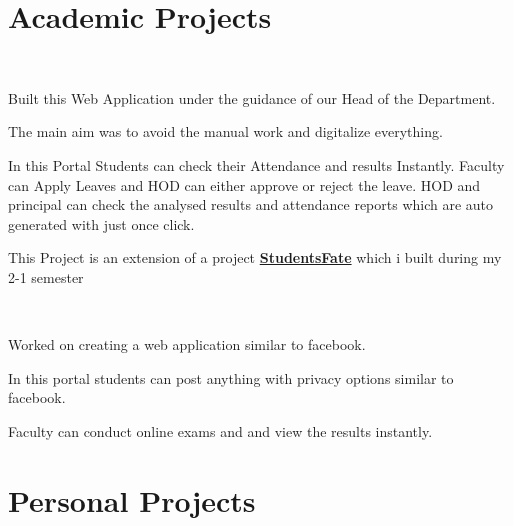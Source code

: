 \documentclass[]{deedy-resume-openfont}
\begin{document}
\begin{minipage}[t]{0.66\textwidth}
\section{Academic Projects}
\\
\begin{tightemize}
\item Built this Web Application under the guidance of our Head of the Department. 
\item The main aim was to avoid the manual work and digitalize everything. \item In this Portal Students can check their Attendance and results Instantly. Faculty can Apply Leaves and HOD can either approve or reject the leave. HOD and principal can check the analysed results and attendance reports which are auto generated with just once click.
\item This Project is an extension of a project \textbf{\href{http://studentsfate.phpnet.us/}{StudentsFate}} which i built during my 2-1 semester
\end{tightemize}
\sectionsep

\\
\begin{tightemize}
\item Worked on creating a web application similar to facebook.
\item In this portal students can post anything with privacy options similar to facebook.
\item Faculty can conduct online exams and and view the results instantly.
\end{tightemize}
\sectionsep


\section{Personal Projects}

\\
\vspace{\topsep}
\\
\sectionsep

\nocite{*}

\end{minipage} 
\end{document}
